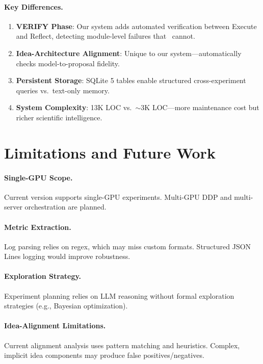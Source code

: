 \documentclass[11pt,a4paper]{article}
\begin{document}
\paragraph{Key Differences.}
\begin{enumerate}[nosep]
\item \textbf{VERIFY Phase}: Our system adds automated verification between Execute and Reflect, detecting module-level failures that~\cite{zhang2026deep} cannot.
\item \textbf{Idea-Architecture Alignment}: Unique to our system---automatically checks model-to-proposal fidelity.
\item \textbf{Persistent Storage}: SQLite 5 tables enable structured cross-experiment queries vs.\ text-only memory.
\item \textbf{System Complexity}: 13K LOC vs.\ ${\sim}3$K LOC---more maintenance cost but richer scientific intelligence.
\end{enumerate}


\section{Limitations and Future Work}

\paragraph{Single-GPU Scope.}
Current version supports single-GPU experiments. Multi-GPU DDP and multi-server orchestration are planned.

\paragraph{Metric Extraction.}
Log parsing relies on regex, which may miss custom formats. Structured JSON Lines logging would improve robustness.

\paragraph{Exploration Strategy.}
Experiment planning relies on LLM reasoning without formal exploration strategies (e.g., Bayesian optimization).

\paragraph{Idea-Alignment Limitations.}
Current alignment analysis uses pattern matching and heuristics. Complex, implicit idea components may produce false positives/negatives.
\end{document}
